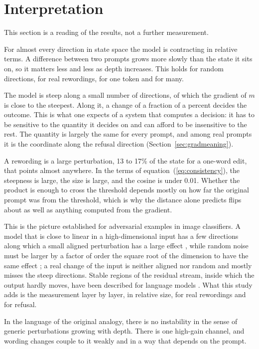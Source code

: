 \documentclass[11pt]{article}
\begin{document}
\section{Interpretation}
\label{sec:interpretation}

This section is a reading of the results, not a further measurement.

For almost every direction in state space the model is contracting in relative terms. A difference between two prompts grows more slowly than the state it sits on, so it matters less and less as depth increases. This holds for random directions, for real rewordings, for one token and for many.

The model is steep along a small number of directions, of which the gradient of $m$ is close to the steepest. Along it, a change of a fraction of a percent decides the outcome. This is what one expects of a system that computes a decision: it has to be sensitive to the quantity it decides on and can afford to be insensitive to the rest. The quantity is largely the same for every prompt, and among real prompts it is the coordinate along the refusal direction (Section~\ref{sec:gradmeaning}).

A rewording is a large perturbation, 13 to 17\% of the state for a one-word edit, that points almost anywhere. In the terms of equation~(\ref{eq:consistency}), the steepness is large, the size is large, and the cosine is under 0.01. Whether the product is enough to cross the threshold depends mostly on how far the original prompt was from the threshold, which is why the distance alone predicts flips about as well as anything computed from the gradient.

This is the picture established for adversarial examples in image classifiers. A model that is close to linear in a high-dimensional input has a few directions along which a small aligned perturbation has a large effect \cite{goodfellow}, while random noise must be larger by a factor of order the square root of the dimension to have the same effect \cite{fawzi}; a real change of the input is neither aligned nor random and mostly misses the steep directions. Stable regions of the residual stream, inside which the output hardly moves, have been described for language models \cite{janiak}. What this study adds is the measurement layer by layer, in relative size, for real rewordings and for refusal.

In the language of the original analogy, there is no instability in the sense of generic perturbations growing with depth. There is one high-gain channel, and wording changes couple to it weakly and in a way that depends on the prompt.
\end{document}
